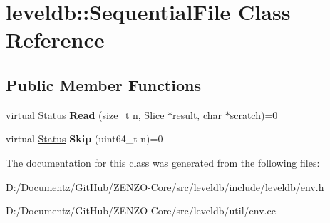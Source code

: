 \hypertarget{classleveldb_1_1_sequential_file}{}\section{leveldb\+::Sequential\+File Class Reference}
\label{classleveldb_1_1_sequential_file}
\subsection*{Public Member Functions}
\begin{DoxyCompactItemize}
\item 
\mbox{\label{classleveldb_1_1_sequential_file_a4136bef1546cdb9fbbd477a635460261}} 
virtual \mbox{\hyperlink{classleveldb_1_1_status}{Status}} {\bfseries Read} (size\+\_\+t n, \mbox{\hyperlink{classleveldb_1_1_slice}{Slice}} $\ast$result, char $\ast$scratch)=0
\item 
\mbox{\label{classleveldb_1_1_sequential_file_a18c94279fc058cad4d03cdfe04b12179}} 
virtual \mbox{\hyperlink{classleveldb_1_1_status}{Status}} {\bfseries Skip} (uint64\+\_\+t n)=0
\end{DoxyCompactItemize}


The documentation for this class was generated from the following files\+:\begin{DoxyCompactItemize}
\item 
D\+:/\+Documentz/\+Git\+Hub/\+Z\+E\+N\+Z\+O-\/\+Core/src/leveldb/include/leveldb/env.\+h\item 
D\+:/\+Documentz/\+Git\+Hub/\+Z\+E\+N\+Z\+O-\/\+Core/src/leveldb/util/env.\+cc\end{DoxyCompactItemize}
